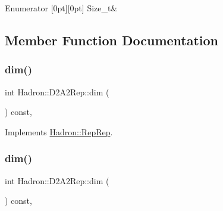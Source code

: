 \begin{DoxyEnumFields}{Enumerator}
[0pt][0pt]{}\mbox{\label{structHadron_1_1D2A2Rep_a647354840eaf7cd020bc78d49609468aaef43e7d095036291143d3c7358dfe1c6}} 
Size\+\_\+t&\\
\hline

\end{DoxyEnumFields}


\subsection{Member Function Documentation}
\mbox{\label{structHadron_1_1D2A2Rep_a3ac73e94eff9828876d64a771f037bb5}} 
\subsubsection{\texorpdfstring{dim()}{dim()}\hspace{0.1cm}{\footnotesize\ttfamily [1/3]}}
{\footnotesize\ttfamily int Hadron\+::\+D2\+A2\+Rep\+::dim (\begin{DoxyParamCaption}{ }\end{DoxyParamCaption}) const\hspace{0.3cm}{\ttfamily [inline]}, {\ttfamily [virtual]}}



Implements \mbox{\hyperlink{structHadron_1_1RepRep_a92c8802e5ed7afd7da43ccfd5b7cd92b}{Hadron\+::\+Rep\+Rep}}.

\mbox{\label{structHadron_1_1D2A2Rep_a3ac73e94eff9828876d64a771f037bb5}} 
\subsubsection{\texorpdfstring{dim()}{dim()}\hspace{0.1cm}{\footnotesize\ttfamily [2/3]}}
{\footnotesize\ttfamily int Hadron\+::\+D2\+A2\+Rep\+::dim (\begin{DoxyParamCaption}{ }\end{DoxyParamCaption}) const\hspace{0.3cm}{\ttfamily [inline]}, {\ttfamily [virtual]}}



